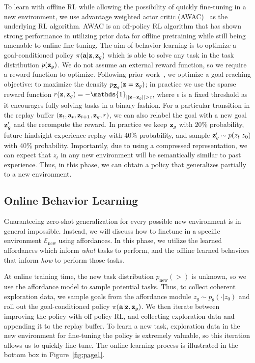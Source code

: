 \documentclass[letterpaper, 10 pt, conference]{ieeeconf}  %
\begin{document}
To learn with offline RL while allowing the possibility of quickly fine-tuning in a new environment, we use advantage weighted actor critic (AWAC)~\cite{nair2020awac} as the underlying RL algorithm.
AWAC is an off-policy RL algorithm that has shown strong performance in utilizing prior data for offline pretraining while still being amenable to online fine-tuning.
The aim of behavior learning is to optimize a goal-conditioned policy $\pi(\mathbf{a}|\mathbf{z}, \mathbf{z}_g)$ which is able to solve any task in the task distribution $p(\mathbf{z}_g)$.
We do not assume an external reward function, so we require a reward function to optimize. 
Following prior work~\cite{andrychowicz2017her, nair2018rig}, we optimize a goal reaching objective: to maximize the density $p_{\mathbf{Z}_g}(\mathbf{z} = \mathbf{z}_g)$; in practice we use the sparse reward function $r(\zt, \zt_g) = -\mathds{1}_{||\zt - \zt_g|| > \epsilon}$, where $\epsilon$ is a fixed threshold as it encourages fully solving tasks in a binary fashion.
For a particular transition in the replay buffer $(\mathbf{z}_t, \mathbf{a}_t, \mathbf{z}_{t+1}, \mathbf{z}_g, r)$, we can also  relabel the goal with a new goal $\mathbf{z}_g'$ and the recompute the reward. In practice we keep $\mathbf{z}_g$ with 20\% probability, future hindsight experience replay with 40\% probability, and sample $\mathbf{z}_g' \sim p(z_t|z_0)$ with 40\% probability.
Importantly, due to using a compressed representation, we can expect that $z_t$ in any new environment will be semantically similar to past experience. Thus, in this phase, we can obtain a policy that generalizes partially to a new environment.



\subsection{Online Behavior Learning}
\label{sec:online_policy}

Guaranteeing zero-shot generalization for every possible new environment is in general impossible. Instead, we will discuss how to finetune in a specific environment $\mathcal{E}_\text{new}$ using affordances. 
In this phase, we utilize the learned affordances which inform \textit{what} tasks to perform, and the offline learned behaviors that inform \textit{how} to perform those tasks.

At online training time, the new task distribution $p_\text{new}(\gt)$ is unknown, so we use the affordance model to sample potential tasks.
Thus, to collect coherent exploration data, we sample goals from the affordance module $z_g \sim p_\theta(\cdot|z_0)$ and roll out the goal-conditioned policy $\pi(\mathbf{a}|\mathbf{z}, \mathbf{z}_g)$.
We then iterate between improving the policy with off-policy RL, and collecting exploration data and appending it to the replay buffer.
To learn a new task, exploration data in the new environment for fine-tuning the policy is extremely valuable, so this iteration allows us to quickly fine-tune. The online learning process is illustrated in the bottom box in Figure~\ref{fig:page1}.
\end{document}
